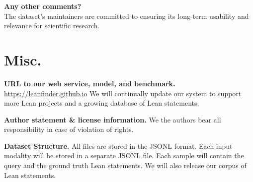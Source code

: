     \textcolor{\sectioncolor}{\textbf{Any other comments?
    }} \\
    The dataset’s maintainers are committed to ensuring its long-term usability and relevance for scientific research.

\vspace{-2ex}
\section{Misc.}
\textbf{URL to our web service, model, and benchmark.} \url{https://leanfinder.github.io} We will continually update our system to support more Lean projects and a growing database of Lean statements.

\textbf{Author statement \& license information.} We the authors bear all responsibility in case of violation of rights.

\textbf{Dataset Structure.}
All files are stored in the JSONL format. Each input modality will be stored in a separate JSONL file. Each sample will contain the query and the ground truth Lean statements. We will also release our corpus of Lean statements.